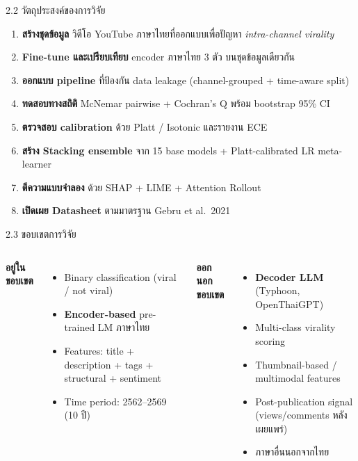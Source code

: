 \documentclass[aspectratio=169,11pt,xcolor=dvipsnames]{beamer}
\newcommand{\hl}[1]{\textcolor{kmitlOrange}{\textbf{#1}}}
\newcommand{\hlb}[1]{\textcolor{kmitlBlue}{\textbf{#1}}}
\begin{document}
\begin{frame}{2.2 วัตถุประสงค์ของการวิจัย}
  \begin{enumerate}\setlength\itemsep{0.5em}
    \item \hlb{สร้างชุดข้อมูล} วิดีโอ YouTube ภาษาไทยที่ออกแบบเพื่อปัญหา \emph{intra-channel virality}
    \item \hlb{Fine-tune และเปรียบเทียบ} encoder ภาษาไทย 3 ตัว บนชุดข้อมูลเดียวกัน
    \item \hlb{ออกแบบ pipeline} ที่ป้องกัน data leakage (channel-grouped + time-aware split)
    \item \hlb{ทดสอบทางสถิติ} McNemar pairwise + Cochran's Q พร้อม bootstrap 95\% CI
    \item \hlb{ตรวจสอบ calibration} ด้วย Platt / Isotonic และรายงาน ECE
    \item \hlb{สร้าง Stacking ensemble} จาก 15 base models + Platt-calibrated LR meta-learner
    \item \hlb{ตีความแบบจำลอง} ด้วย SHAP + LIME + Attention Rollout
    \item \hlb{เปิดเผย Datasheet} ตามมาตรฐาน Gebru et al.\ 2021
  \end{enumerate}
\end{frame}

\begin{frame}{2.3 ขอบเขตการวิจัย}
  \begin{columns}
    \textbf{อยู่ในขอบเขต}
    \begin{itemize}
      \item Binary classification (viral / not viral)
      \item \hl{Encoder-based} pre-trained LM ภาษาไทย
      \item Features: title + description + tags + structural + sentiment
      \item Time period: 2562--2569 (10 ปี)
    \end{itemize}
    \textbf{ออกนอกขอบเขต}
    \begin{itemize}
      \item \hl{Decoder LLM} (Typhoon, OpenThaiGPT)
      \item Multi-class virality scoring
      \item Thumbnail-based / multimodal features
      \item Post-publication signal (views/comments หลังเผยแพร่)
      \item ภาษาอื่นนอกจากไทย
    \end{itemize}
  \end{columns}
\end{frame}
\end{document}
